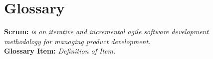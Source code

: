 \section{Glossary}

\newcommand{\glossaryitem}[2]{\textbf{#1:} \textit{#2}\vspace{0.5cm}\\}

\glossaryitem{Scrum}{is an iterative and incremental agile software development\\ methodology for managing product development.}
\glossaryitem{Glossary Item}{Definition of Item.}